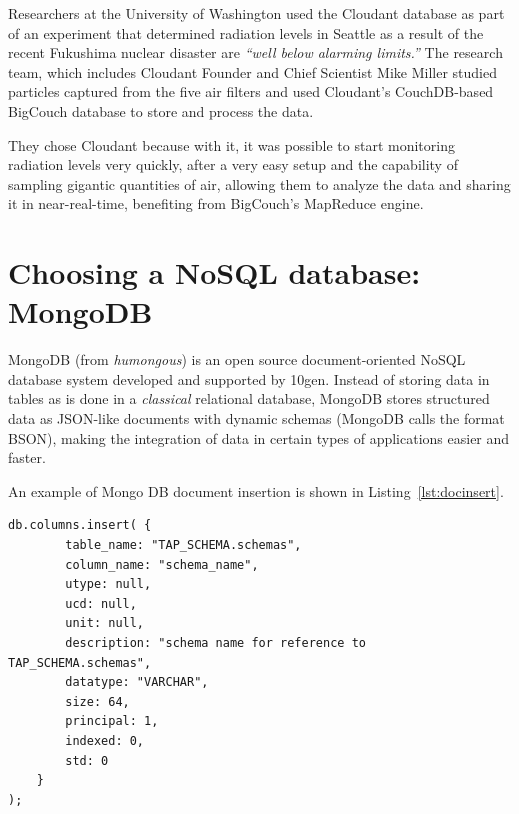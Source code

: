 Researchers at the University of Washington used the Cloudant  database as part of an experiment that determined radiation levels in Seattle as a result of the recent Fukushima nuclear disaster are \emph{``well below alarming limits.''} The research team, which includes Cloudant Founder and Chief Scientist Mike Miller studied particles captured from the five air filters and used Cloudant’s CouchDB-based BigCouch database to store and process the data.

They chose Cloudant because with it, it was possible to start monitoring radiation levels very quickly, after a very easy setup and the capability of sampling gigantic quantities of air, allowing them to analyze the data and sharing it in near-real-time,
benefiting from BigCouch's MapReduce engine.





\section{Choosing a NoSQL database: MongoDB} %
\label{sec:mongodb_a_document_oriented_database}

MongoDB (from \emph{humongous}) is an open source document-oriented
NoSQL
database system developed and supported by 10gen.
Instead of storing data in tables as is done in a \emph{classical} relational database, MongoDB stores structured data as JSON-like documents with dynamic schemas (MongoDB calls the format BSON), making the integration of data in certain types of applications easier and faster. 

An example of Mongo DB document insertion is shown in Listing~\ref{lst:docinsert}.

\begin{lstlisting}[float,label=lst:docinsert,caption=MongoDB column insertion example in JSON]
db.columns.insert( {
		table_name: "TAP_SCHEMA.schemas",
		column_name: "schema_name",
		utype: null,
		ucd: null,
		unit: null,
		description: "schema name for reference to TAP_SCHEMA.schemas",
		datatype: "VARCHAR",
		size: 64,
		principal: 1,
		indexed: 0,
		std: 0
	}
);
\end{lstlisting} 


